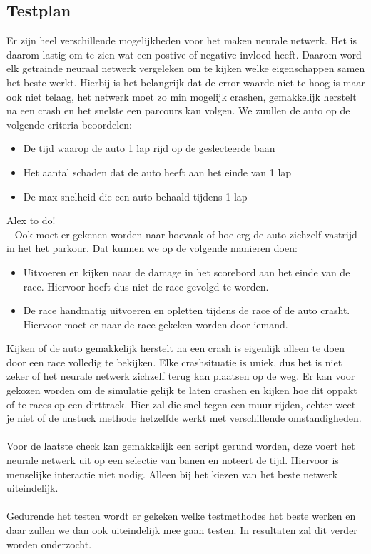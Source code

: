 \subsection{Testplan}
Er zijn heel verschillende mogelijkheden voor het maken neurale netwerk. Het is daarom lastig om te zien wat een postive of negative invloed heeft. Daarom word elk getrainde neuraal netwerk  vergeleken om te kijken welke eigenschappen samen het beste werkt. Hierbij is het belangrijk dat de error waarde niet te hoog is maar ook niet telaag, het netwerk moet zo min mogelijk crashen, gemakkelijk herstelt na een crash en het snelste een parcours kan volgen. We zuullen de auto op de volgende criteria beoordelen:
\begin{itemize}
\item De tijd waarop de auto 1 lap rijd op de geslecteerde baan
\item Het aantal schaden dat de auto heeft aan het einde van 1 lap
\item De max snelheid die een auto behaald tijdens 1 lap
\end{itemize}
Alex to do! \\\
Ook moet er gekenen worden naar hoevaak of hoe erg de auto zichzelf vastrijd in het het parkour. Dat kunnen we op de volgende manieren doen:
\begin{itemize}
\item Uitvoeren en kijken naar de damage in het scorebord aan het einde van de race. Hiervoor hoeft dus niet de race gevolgd te worden.
\item De race handmatig uitvoeren en opletten tijdens de race of de auto crasht. Hiervoor moet er naar de race gekeken worden door iemand.
\end{itemize}


\noindent Kijken of de auto gemakkelijk herstelt na een crash is eigenlijk alleen te doen door een race volledig te bekijken. Elke crashsituatie is uniek, dus het is niet zeker of het neurale netwerk zichzelf terug kan plaatsen op de weg. Er kan voor gekozen worden om de simulatie gelijk te laten crashen en kijken hoe dit oppakt of te races op een dirttrack. Hier zal die snel tegen een muur rijden, echter weet je niet of de unstuck methode hetzelfde werkt met verschillende omstandigheden. \\\\
Voor de laatste check kan gemakkelijk een script gerund worden, deze voert het neurale netwerk uit op een selectie van banen en noteert de tijd. Hiervoor is menselijke interactie niet nodig. Alleen bij het kiezen van het beste netwerk uiteindelijk. \\\\

\noindent Gedurende het testen wordt er gekeken welke testmethodes het beste werken en daar zullen we dan ook uiteindelijk mee gaan testen. In resultaten zal dit verder worden onderzocht. 
